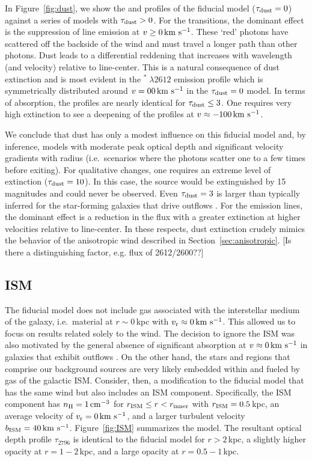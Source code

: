 \documentclass[12pt,preprint]{aastex}
\begin{document}
In Figure~\ref{fig:dust}, we show the  and 
profiles of the fiducial model ($\tau_{\rm dust} = 0$) against a series of
models with $\tau_{\rm dust} > 0$.  For the  transitions, the
dominant effect is the suppression of line emission at $v \ge 0
\, {\rm km~s^{-1}}$.  These `red' photons have scattered off the
backside of the wind and must travel a longer path than other
photons.  Dust leads to a differential reddening that increases with wavelength (and
velocity) relative to line-center. This is a natural consequence of dust
extinction and is most evident in the $^* \; \lambda 2612$
emission profile which is symmetrically distributed around
$v=0 0 \, {\rm km~s^{-1}}$ in the $\tau_{\rm dust}=0$ model.   In terms of absorption, the profiles are
nearly identical for $\tau_{\rm dust} \le 3$.  One requires very high
extinction to see a deepening of the profiles at $v \approx -100 \, {\rm km~s^{-1}}$.

We conclude that dust has only a modest influence on this fiducial model and,
by inference, models with moderate peak optical depth and
significant velocity gradients with radius (i.e.\ scenarios where the
photons scatter one to a few times before exiting).
For qualitative changes, one requires an extreme level of
extinction ($\tau_{\rm dust} = 10$).  In this case, the source would be
extinguished by 15\,magnitudes and could never be observed. 
Even $\tau_{\rm dust} = 3$ is larger than typically inferred for the
star-forming galaxies that drive outflows \citep[e.g.][]{dust}.
For the emission lines,
the dominant effect is a reduction in the flux 
with a greater extinction at higher velocities relative to line-center.
In these respects, dust extinction crudely mimics the behavior of the
anisotropic
wind described in Section~\ref{sec:anisotropic}. [Is there a
distinguishing factor, e.g. flux of 2612/2600??]


\subsection{ISM}
\label{sec:ISM}

The fiducial model does not include gas associated with
the interstellar medium of the galaxy, i.e.\ material at $r \sim
0$\,kpc with $v_{\rm r} \approx 0 \, {\rm km~s^{-1}}$.  This allowed us to focus on
results related solely to the wind.  The decision to ignore the ISM
was also motivated by the general absence of significant absorption at
$v \approx 0 \, {\rm km~s^{-1}}$ in galaxies that exhibit outflows 
\citep[e.g.][]{wcp+09,rubin09,steidel+10}.
On the other hand, the stars and  regions that comprise our
background sources are very likely embedded within and fueled by gas
of the galactic ISM.  
Consider, then, a modification to the fiducial model that has the
same wind but also includes an ISM component. 
Specifically, the ISM component has $n_{\rm H} = 1 \, {\rm cm^{-3}}$ for
$r_{\rm ISM} \le r < r_{\rm inner}$ with $r_{\rm ISM} = 0.5$\,kpc, 
an average velocity of $v_{\rm r} = 0 \, {\rm km~s^{-1}}$, and a larger turbulent velocity $b_{\rm ISM} = 40 \, {\rm km~s^{-1}}$.
Figure~\ref{fig:ISM} summarizes the model.
The resultant optical depth profile $\tau_{2796}$ is identical to the
fiducial model for $r > 2$\,kpc, a slightly higher opacity at
$r=1-2$\,kpc, and a large opacity at $r = 0.5-1$\,kpc.
\end{document}
